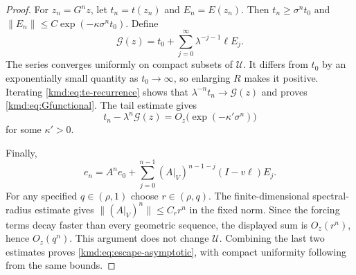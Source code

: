 \documentclass[11pt,a4paper]{article}
\numberwithin{equation}{section}
\theoremstyle{definition}
\theoremstyle{remark}
\newcommand{\calU}{\mathcal U}
\begin{document}
\begin{proof}
For $z_n=G^nz$, let $t_n=t(z_n)$ and $E_n=E(z_n)$. Then
$t_n\ge\sigma^nt_0$ and
$\|E_n\|\le C\exp(-\kappa\sigma^nt_0)$. Define
\begin{equation}
 \mathcal G(z)=t_0+\sum_{j=0}^{\infty}
       \lambda^{-j-1}\ell E_j.
 \label{kmd:eq:escape-series}
\end{equation}
The series converges uniformly on compact subsets of $\calU$.
It differs from $t_0$ by an exponentially small quantity as
$t_0\to\infty$, so enlarging $R$ makes it positive. Iterating
\eqref{kmd:eq:te-recurrence} shows that
$\lambda^{-n}t_n\to\mathcal G(z)$ and proves
\eqref{kmd:eq:Gfunctional}. The tail estimate gives
\[
 t_n-\lambda^n\mathcal G(z)
 =O_z\bigl(\exp(-\kappa'\sigma^n)\bigr)
\]
for some $\kappa'>0$.

Finally,
\[
 e_n=A^ne_0+
 \sum_{j=0}^{n-1}(A|_V)^{n-1-j}(I-v\ell)E_j.
\]
For any specified $q\in(\rho,1)$ choose $r\in(\rho,q)$. The
finite-dimensional spectral-radius estimate gives
$\|(A|_V)^n\|\le C_r r^n$ in the fixed norm. Since the forcing
terms decay faster than every geometric sequence, the displayed sum
is $O_z(r^n)$, hence $O_z(q^n)$. This argument does not change
$\calU$. Combining the last two estimates proves \eqref{kmd:eq:escape-asymptotic}, with compact
uniformity following from the same bounds.
\end{proof}
\end{document}
